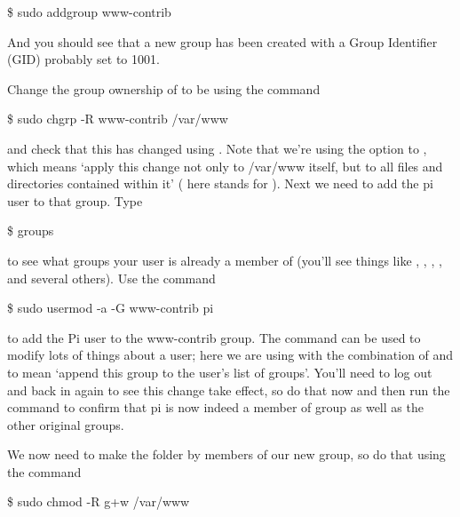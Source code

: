 \begin{ttoutenv}
\$ sudo addgroup www-contrib
\end{ttoutenv}

And you should see that a new group has been created with a Group Identifier (GID) probably set to 1001. 

Change the group ownership of  to be  using the command

\begin{ttoutenv}
\$ sudo chgrp -R www-contrib /var/www
\end{ttoutenv}

and check that this has changed using . Note that we're using the  option to , which means `apply this change not only to /var/www itself, but to all files and directories contained within it' ( here stands for ). Next we need to add the pi user to that group. Type

\begin{ttoutenv}
\$ groups
\end{ttoutenv}

to see what groups your user is already a member of (you'll see things like , , , ,  and several others). Use the command 

\begin{ttoutenv}
\$ sudo usermod -a -G www-contrib pi
\end{ttoutenv}

to add the Pi user to the www-contrib group. The  command can be used to modify lots of things about a user; here we are using with the combination of  and  to mean `append this group to the user's list of groups'. You'll need to log out and back in again to see this change take effect, so do that now and then run the  command to confirm that pi is now indeed a member of group  as well as the other original groups. 


We now need to make the  folder  by members of our new group, so do that using the command

\begin{ttoutenv}
\$ sudo chmod -R g+w /var/www
\end{ttoutenv}

